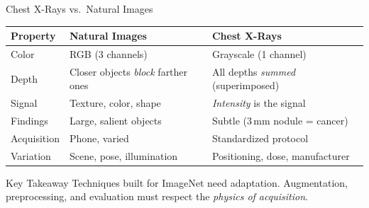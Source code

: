\documentclass[aspectratio=169,10pt]{beamer}
\begin{document}
\begin{frame}{Chest X-Rays vs.\ Natural Images}
\begin{center}
{\small
\renewcommand{\arraystretch}{1.2}
\begin{tabular}{p{2.5cm}p{4.2cm}p{4.5cm}}
\toprule
\textbf{Property} & \textbf{Natural Images} & \textbf{Chest X-Rays} \\
\midrule
Color & RGB (3 channels) & Grayscale (1 channel) \\
Depth & Closer objects \emph{block} farther ones & All depths \emph{summed} (superimposed) \\
Signal & Texture, color, shape & \emph{Intensity} is the signal \\
Findings & Large, salient objects & Subtle (3\,mm nodule = cancer) \\
Acquisition & Phone, varied & Standardized protocol \\
Variation & Scene, pose, illumination & Positioning, dose, manufacturer \\
\bottomrule
\end{tabular}
}
\end{center}

\pause
\begin{block}{Key Takeaway}
Techniques built for ImageNet need adaptation. Augmentation, preprocessing, and evaluation must respect the \emph{physics of acquisition}.
\end{block}
\end{frame}
\end{document}
